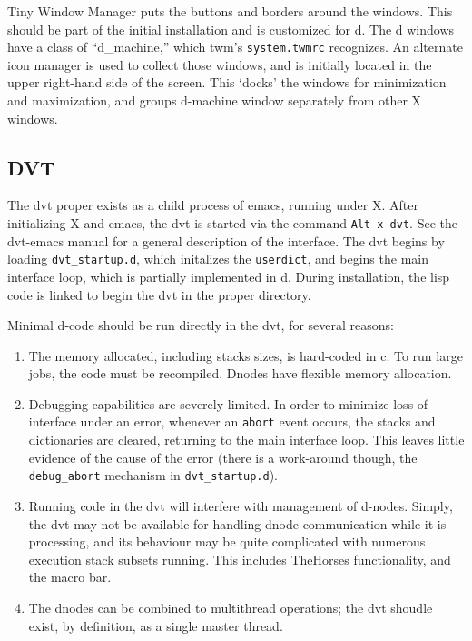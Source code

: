 \documentclass[12pt]{article}
\begin{document}
Tiny Window Manager puts the buttons and borders around the windows.
This should be part of the initial installation and is customized for
d.  The d windows have a class of ``d\_machine,'' which twm's
\texttt{system.twmrc} recognizes.  An alternate icon manager is used
to collect those windows, and is initially located in the upper
right-hand side of the screen.  This `docks' the windows for
minimization and maximization, and groups d-machine window separately
from other X windows.

\subsection{DVT}
\label{sec:dvt}

The dvt proper exists as a child process of emacs, running under X.
After initializing X and emacs, the dvt is started via the command
\verb$Alt-x dvt$.  See the dvt-emacs manual \citep{dvt-emacs} for a
general description of the interface. The dvt begins by loading
\texttt{dvt\_startup.d}, which initalizes the \verb$userdict$, and
begins the main interface loop, which is partially implemented in d.
During installation, the lisp code is linked to begin the dvt in the
proper directory.

Minimal d-code should be run directly in the dvt, for several reasons:
\begin{enumerate}
  \item The memory allocated, including stacks sizes, is hard-coded in
  c.  To run large jobs, the code must be recompiled. Dnodes have
  flexible memory allocation.
  \item Debugging capabilities are severely limited. In order to
  minimize loss of interface under an error, whenever an \verb$abort$
  event occurs, the stacks and dictionaries are cleared, returning to
  the main interface loop. This leaves little evidence of the cause of
  the error (there is a work-around though, the \verb$debug_abort$
  mechanism in \texttt{dvt\_startup.d}).
  \item Running code in the dvt will interfere with management of
  d-nodes. Simply, the dvt may not be available for handling dnode
  communication while it is processing, and its behaviour may be quite
  complicated with numerous execution stack subsets running. This
  includes TheHorses functionality, and the macro bar.
  \item The dnodes can be combined to multithread operations; the dvt
  shoudle exist, by definition, as a single master thread.
\end{enumerate}
\end{document}
